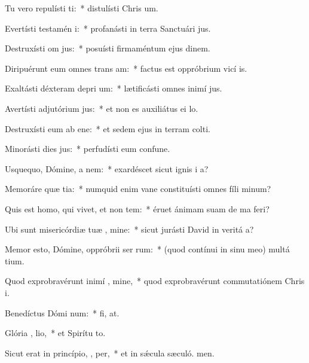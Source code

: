 \item Tu vero repulísti  ti:~* distulísti Chris um.
\item Evertísti testamén  i:~* profanásti in terra Sanctuári jus.
\item Destruxísti om  jus:~* posuísti firmaméntum ejus dinem.
\item Diripuérunt eum omnes trans am:~* factus est oppróbrium vicí is.
\item Exaltásti déxteram depri um:~* lætificásti omnes inimí jus.
\item Avertísti adjutórium  jus:~* et non es auxiliátus ei  lo.
\item Destruxísti eum ab ene:~* et sedem ejus in terram colti.
\item Minorásti dies  jus:~* perfudísti eum confune.
\item Usquequo, Dómine, a  nem:~* exardéscet sicut ignis i a?
\item Memoráre quæ  tia:~* numquid enim vane constituísti omnes fíli minum?
\item Quis est homo, qui vivet, et non  tem:~* éruet ánimam suam de ma feri?
\item Ubi sunt misericórdiæ tuæ , mine:~* sicut jurásti David in veritá a?
\item Memor esto, Dómine, oppróbrii ser rum:~* (quod contínui in sinu meo) multá tium.
\item Quod exprobravérunt inimí , mine,~* quod exprobravérunt commutatiónem Chris i.
\item Benedíctus Dómi  num:~* fi, at.
\item Glória ,  lio,~* et Spirítu to.
\item Sicut erat in princípio,  ,  per,~* et in sǽcula sæculó. men.
